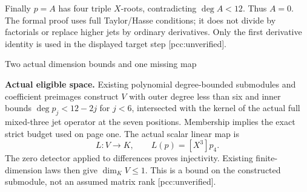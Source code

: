 \documentclass[10pt]{article}
\begin{document}
Finally $p=A$ has four triple $X$-roots, contradicting $\deg A<12$.
Thus $A=0$. The formal proof uses full Taylor/Hasse conditions; it does not
divide by factorials or replace higher jets by ordinary derivatives.
Only the first derivative identity is used in the displayed target step
[pcc:unverified].
\newpage
\begin{center}{\Large Two actual dimension bounds and one missing map}\end{center}
\textbf{Actual eligible space.}
Existing polynomial degree-bounded submodules and coefficient preimages
construct $V$ with outer degree less than six and inner bounds
$\deg p_j<12-2j$ for $j<6$, intersected with the kernel of the actual
full mixed-three jet operator at the seven positions.
Membership implies the exact strict budget used on page one.
The actual scalar linear map is
\[
 L:V\longrightarrow K,\qquad L(p)=[X^3]p_4.
\]
The zero detector applied to differences proves injectivity.
Existing finite-dimension laws then give $\dim_KV\le1$.
This is a bound on the constructed submodule, not an assumed matrix rank
[pcc:unverified].
\end{document}
